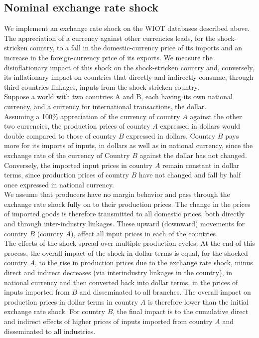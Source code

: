\documentclass[11pt,a4paper]{article}
\begin{document}
\subsection{Nominal exchange rate shock}
\label{subsec:chocchange}

We implement an exchange rate shock on the WIOT databases described above. 
The appreciation of a currency against other currencies leads, for the shock-stricken country, to a fall in the domestic-currency price of its imports and an increase in the foreign-currency price of its exports. We measure the disinflationary impact of this shock on the shock-stricken country and, conversely, its inflationary impact on countries that directly and indirectly consume, through third countries linkages, inputs from the shock-stricken country.\\
Suppose a world with two countries A and B, each having its own national currency, and a currency for international transactions, the dollar. \\
Assuming a 100$\%$ appreciation of the currency of country $A$ against the other two currencies, the production prices of country $A$ expressed in dollars would double compared to those of country $B$ expressed in dollars. Country $B$ pays more for its imports of inputs, in dollars as well as in national currency, since the exchange rate of the currency of Country $B$ against the dollar has not changed. Conversely, the imported input prices in country $A$ remain constant in dollar terms, since production prices of country $B$ have not changed and fall by half once expressed in national currency.\\
We assume that producers have no margin behavior and pass through the exchange rate shock fully on to their production prices. The change in the prices of imported goods is therefore transmitted to all domestic prices, both directly and through inter-industry linkages. These upward (downward) movements for country $B$ (country $A$), affect all input prices in each of the countries.\\
The effects of the shock spread over multiple production cycles. At the end of this process, the overall impact of the shock in dollar terms is equal, for the shocked country $A$, to the rise in production prices due to the exchange rate shock, minus direct and indirect decreases (via interindustry linkages in the country), in national currency and then converted back into dollar terms, in the prices of inputs imported from $B$ and disseminated to all branches. The overall impact on production prices in dollar terms in country $A$ is therefore lower than the initial exchange rate shock. For country $B$, the final impact is to the cumulative direct and indirect effects of higher prices of inputs imported from country $A$ and disseminated to all industries.\\
\end{document}
